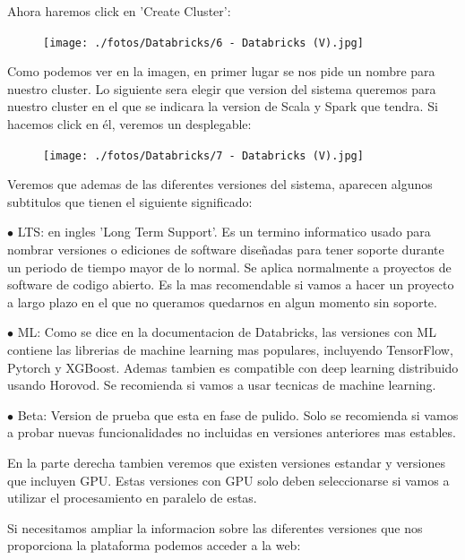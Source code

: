 \documentclass[a4paper,10pt]{article}
\begin{document}
Ahora haremos click en 'Create Cluster':

\begin{figure}[H]
\begin{center}
\texttt{[image: ./fotos/Databricks/6 - Databricks (V).jpg]}
\end{center}
\end{figure}

Como podemos ver en la imagen, en primer lugar se nos pide un nombre para nuestro cluster. Lo siguiente sera elegir que version del sistema queremos para nuestro cluster en el que se indicara la version de Scala y Spark que tendra. Si hacemos click en él, veremos un desplegable:

\begin{figure}[H]
\begin{center}
\texttt{[image: ./fotos/Databricks/7 - Databricks (V).jpg]}
\end{center}
\end{figure}

Veremos que ademas de las diferentes versiones del sistema, aparecen algunos subtitulos que tienen el siguiente significado:

$\bullet$ LTS: en ingles 'Long Term Support'. Es un termino informatico usado para nombrar versiones o ediciones de software diseñadas para tener soporte durante un periodo de tiempo mayor de lo normal. Se aplica normalmente a proyectos de software de codigo abierto. Es la mas recomendable si vamos a hacer un proyecto a largo plazo en el que no queramos quedarnos en algun momento sin soporte.

$\bullet$ ML: Como se dice en la documentacion de Databricks, las versiones con ML contiene las librerias de machine learning mas populares, incluyendo TensorFlow, Pytorch y XGBoost. Ademas tambien es compatible con deep learning distribuido usando Horovod. Se recomienda si vamos a usar tecnicas de machine learning.

$\bullet$ Beta: Version de prueba que esta en fase de pulido. Solo se recomienda si vamos a probar nuevas funcionalidades no incluidas en versiones anteriores mas estables.

En la parte derecha tambien veremos que existen versiones estandar y versiones que incluyen GPU. Estas versiones con GPU solo deben seleccionarse si vamos a utilizar el procesamiento en paralelo de estas.

Si necesitamos ampliar la informacion sobre las diferentes versiones que nos proporciona la plataforma podemos acceder a la web:
\end{document}
